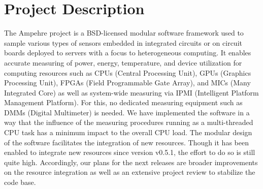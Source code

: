 %
%
%
%
%
%

\section{Project Description}
The Ampehre project is a BSD-licensed modular software framework used to sample various types of sensors embedded in integrated circuits or on circuit boards deployed to servers with a focus to heterogeneous computing. It enables accurate measuring of power, energy, temperature, and device utilization for computing resources such as CPUs (Central Processing Unit), GPUs (Graphics Processing Unit), FPGAs (Field Programmable Gate Array), and MICs (Many Integrated Core) as well as system-wide measuring via IPMI (Intelligent Platform Management Platform). For this, no dedicated measuring equipment such as DMMs (Digital Multimeter) is needed. We have implemented the software in a way that the influence of the measuring procedures running as a multi-threaded CPU task has a minimum impact to the overall CPU load. The modular design of the software facilitates the integration of new resources. Though it has been enabled to integrate new resources since version v0.5.1, the effort to do so is still quite high. Accordingly, our plans for the next releases are broader improvements on the resource integration as well as an extensive project review to stabilize the code base.

